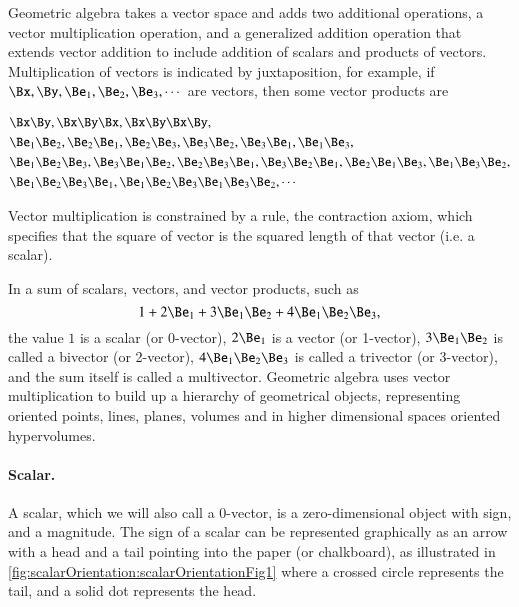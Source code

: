 %
%
Geometric algebra takes a vector space and adds two additional operations, a vector multiplication operation, and a generalized addition operation that extends vector addition to include addition of scalars and products of vectors.
Multiplication of vectors is indicated by juxtaposition, for example, if \( \Bx, \By, \Be_1, \Be_2, \Be_3, \cdots \) are vectors, then some vector products are

\begin{dmath}\label{eqn:multivector:20}
\begin{aligned}
&\Bx \By, \Bx \By \Bx, \Bx \By \Bx \By, \\
&\Be_1 \Be_2, \Be_2 \Be_1, \Be_2 \Be_3, \Be_3 \Be_2, \Be_3 \Be_1, \Be_1 \Be_3, \\
&\Be_1 \Be_2 \Be_3, \Be_3 \Be_1 \Be_2, \Be_2 \Be_3 \Be_1, \Be_3 \Be_2 \Be_1, \Be_2 \Be_1 \Be_3, \Be_1 \Be_3 \Be_2, \\
&\Be_1 \Be_2 \Be_3 \Be_1, \Be_1 \Be_2 \Be_3 \Be_1 \Be_3 \Be_2, \cdots
\end{aligned}
\end{dmath}

Vector multiplication is constrained by a rule, the contraction axiom, which specifies that the square of vector is the squared length of that vector (i.e. a scalar).

In a sum of scalars, vectors, and vector products, such as
\begin{dmath}\label{eqn:multivector:40}
1 + 2 \Be_1 + 3 \Be_1 \Be_2 + 4 \Be_1 \Be_2 \Be_3,
\end{dmath}
the value \( 1 \) is a scalar (or 0-vector), \( 2 \Be_1 \) is a vector (or 1-vector),
\( 3 \Be_1 \Be_2 \) is called a bivector (or 2-vector), \( 4 \Be_1 \Be_2 \Be_3 \) is called a trivector (or 3-vector), and the sum itself is called a multivector.
Geometric algebra uses vector multiplication to build up a hierarchy of geometrical objects, representing oriented points, lines, planes, volumes and in higher dimensional spaces oriented hypervolumes.

\paragraph{Scalar.}
A scalar, which we will also call a 0-vector, is a zero-dimensional object with sign, and a magnitude.
The sign of a scalar can be represented graphically as an arrow with a head and a tail pointing into the paper (or chalkboard),
as illustrated in
\cref{fig:scalarOrientation:scalarOrientationFig1} where a crossed circle represents the tail, and a solid dot represents the head.

